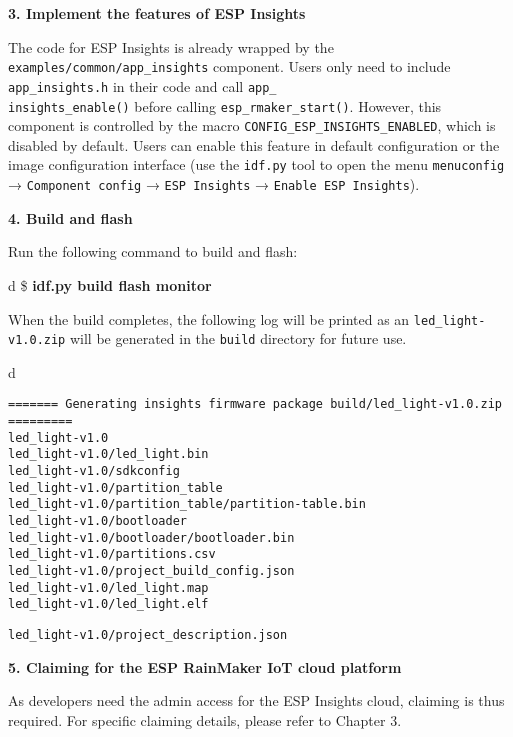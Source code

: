 \documentclass[a4paper,12pt]{book}
\begin{document}
\textbf{3. Implement the features of ESP Insights}

The code for ESP Insights is already wrapped by the \verb|examples/common/app_insights| component. Users only need to include \verb|app_insights.h| in their code and call \verb|app_|\\ \verb|insights_enable()| before calling \verb|esp_rmaker_start()|. However, this component is controlled by the macro \verb|CONFIG_ESP_INSIGHTS_ENABLED|, which is disabled by default. Users can enable this feature in default configuration or the image configuration interface (use the \verb|idf.py| tool to open the menu \verb|menuconfig| → \verb|Component config| → \verb|ESP Insights| → \verb|Enable ESP Insights|).

\textbf{4. Build and flash}

Run the following command to build and flash:

\begin{codebloc}
\begin{tabular}{d}
\$ \textbf{idf.py build flash monitor}
\end{tabular}
\end{codebloc}

When the build completes, the following log will be printed as an \verb|led_light-v1.0.zip| will be generated in the \verb|build| directory for future use.

\begin{codebloc}
\begin{tabular}{d}
\vspace{2pt}
\begin{verbatim}
======= Generating insights firmware package build/led_light-v1.0.zip =========
led_light-v1.0
led_light-v1.0/led_light.bin
led_light-v1.0/sdkconfig
led_light-v1.0/partition_table
led_light-v1.0/partition_table/partition-table.bin
led_light-v1.0/bootloader
led_light-v1.0/bootloader/bootloader.bin
led_light-v1.0/partitions.csv
led_light-v1.0/project_build_config.json
led_light-v1.0/led_light.map
led_light-v1.0/led_light.elf
\end{verbatim}
\verb|led_light-v1.0/project_description.json|
\end{tabular}
\end{codebloc}

\textbf{5. Claiming for the ESP RainMaker IoT cloud platform}

As developers need the admin access for the ESP Insights cloud, claiming is thus required. For specific claiming details, please refer to Chapter 3.
\end{document}
